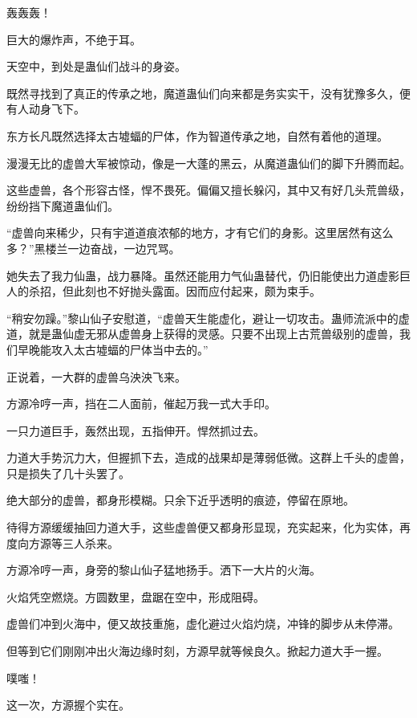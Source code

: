 
\begin{this_body}

轰轰轰！

巨大的爆炸声，不绝于耳。

天空中，到处是蛊仙们战斗的身姿。

既然寻找到了真正的传承之地，魔道蛊仙们向来都是务实实干，没有犹豫多久，便有人动身飞下。

东方长凡既然选择太古墟蝠的尸体，作为智道传承之地，自然有着他的道理。

漫漫无比的虚兽大军被惊动，像是一大蓬的黑云，从魔道蛊仙们的脚下升腾而起。

这些虚兽，各个形容古怪，悍不畏死。偏偏又擅长躲闪，其中又有好几头荒兽级，纷纷挡下魔道蛊仙们。

“虚兽向来稀少，只有宇道道痕浓郁的地方，才有它们的身影。这里居然有这么多？”黑楼兰一边奋战，一边咒骂。

她失去了我力仙蛊，战力暴降。虽然还能用力气仙蛊替代，仍旧能使出力道虚影巨人的杀招，但此刻也不好抛头露面。因而应付起来，颇为束手。

“稍安勿躁。”黎山仙子安慰道，“虚兽天生能虚化，避让一切攻击。蛊师流派中的虚道，就是蛊仙虚无邪从虚兽身上获得的灵感。只要不出现上古荒兽级别的虚兽，我们早晚能攻入太古墟蝠的尸体当中去的。”

正说着，一大群的虚兽乌泱泱飞来。

方源冷哼一声，挡在二人面前，催起万我一式大手印。

一只力道巨手，轰然出现，五指伸开。悍然抓过去。

力道大手势沉力大，但握抓下去，造成的战果却是薄弱低微。这群上千头的虚兽，只是损失了几十头罢了。

绝大部分的虚兽，都身形模糊。只余下近乎透明的痕迹，停留在原地。

待得方源缓缓抽回力道大手，这些虚兽便又都身形显现，充实起来，化为实体，再度向方源等三人杀来。

方源冷哼一声，身旁的黎山仙子猛地扬手。洒下一大片的火海。

火焰凭空燃烧。方圆数里，盘踞在空中，形成阻碍。

虚兽们冲到火海中，便又故技重施，虚化避过火焰灼烧，冲锋的脚步从未停滞。

但等到它们刚刚冲出火海边缘时刻，方源早就等候良久。掀起力道大手一握。

噗嗤！

这一次，方源握个实在。


\end{this_body}
